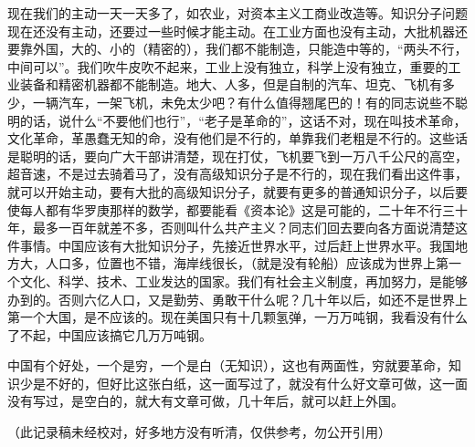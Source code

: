现在我们的主动一天一天多了，如农业，对资本主义工商业改造等。知识分子问题现在还没有主动，还要过一些时候才能主动。在工业方面也没有主动，大批机器还要靠外国，大的、小的（精密的），我们都不能制造，只能造中等的，“两头不行，中间可以”。我们吹牛皮吹不起来，工业上没有独立，科学上没有独立，重要的工业装备和精密机器都不能制造。地大、人多，但是自制的汽车、坦克、飞机有多少，一辆汽车，一架飞机，未免太少吧？有什么值得翘尾巴的！有的同志说些不聪明的话，说什么“不要他们也行”，“老子是革命的”，这话不对，现在叫技术革命，文化革命，革愚蠢无知的命，没有他们是不行的，单靠我们老粗是不行的。这些话是聪明的话，要向广大干部讲清楚，现在打仗，飞机要飞到一万八千公尺的高空，超音速，不是过去骑着马了，没有高级知识分子是不行的，现在我们看出这件事，就可以开始主动，要有大批的高级知识分子，就要有更多的普通知识分子，以后要使每人都有华罗庚那样的数学，都要能看《资本论》这是可能的，二十年不行三十年，最多一百年就差不多，否则叫什么共产主义？同志们回去要向各方面说清楚这件事情。中国应该有大批知识分子，先接近世界水平，过后赶上世界水平。我国地方大，人口多，位置也不错，海岸线很长，（就是没有轮船）应该成为世界上第一个文化、科学、技术、工业发达的国家。我们有社会主义制度，再加努力，是能够办到的。否则六亿人口，又是勤劳、勇敢干什么呢？几十年以后，如还不是世界上第一个大国，是不应该的。现在美国只有十几颗氢弹，一万万吨钢，我看没有什么了不起，中国应该搞它几万万吨钢。

中国有个好处，一个是穷，一个是白（无知识），这也有两面性，穷就要革命，知识少是不好的，但好比这张白纸，这一面写过了，就没有什么好文章可做，这一面没有写过，是空白的，就大有文章可做，几十年后，就可以赶上外国。

（此记录稿未经校对，好多地方没有听清，仅供参考，勿公开引用）


